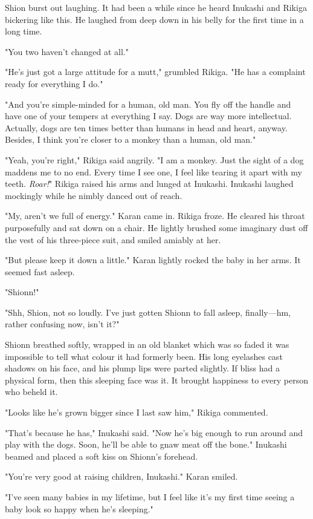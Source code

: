 Shion burst out laughing. It had been a while since he heard Inukashi
and Rikiga bickering like this. He laughed from deep down in his belly
for the first time in a long time.

"You two haven't changed at all."

"He's just got a large attitude for a mutt," grumbled Rikiga. "He has a
complaint ready for everything I do."

"And you're simple-minded for a human, old man. You fly off the handle
and have one of your tempers at everything I say. Dogs are way more
intellectual. Actually, dogs are ten times better than humans in head
and heart, anyway. Besides, I think you're closer to a monkey than a
human, old man."

"Yeah, you're right," Rikiga said angrily. "I am a monkey. Just the
sight of a dog maddens me to no end. Every time I see one, I feel like
tearing it apart with my teeth. \emph{Roar!}" Rikiga raised his arms and lunged
at Inukashi. Inukashi laughed mockingly while he nimbly danced out of
reach.

"My, aren't we full of energy." Karan came in. Rikiga froze. He cleared
his throat purposefully and sat down on a chair. He lightly brushed some
imaginary dust off the vest of his three-piece suit, and smiled amiably
at her.

"But please keep it down a little." Karan lightly rocked the baby in her
arms. It seemed fast asleep.

"Shionn!"

"Shh, Shion, not so loudly. I've just gotten Shionn to fall asleep,
finally---hm, rather confusing now, isn't it?"

Shionn breathed softly, wrapped in an old blanket which was so faded it
was impossible to tell what colour it had formerly been. His long
eyelashes cast shadows on his face, and his plump lips were parted
slightly. If bliss had a physical form, then this sleeping face was it.
It brought happiness to every person who beheld it.

"Looks like he's grown bigger since I last saw him," Rikiga commented.

"That's because he has," Inukashi said. "Now he's big enough to run
around and play with the dogs. Soon, he'll be able to gnaw meat off the
bone." Inukashi beamed and placed a soft kiss on Shionn's forehead.

"You're very good at raising children, Inukashi." Karan smiled.

"I've seen many babies in my lifetime, but I feel like it's my first
time seeing a baby look so happy when he's sleeping."


